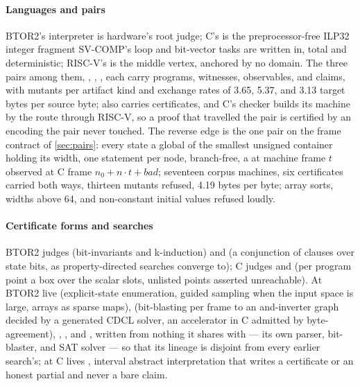 \paragraph{Languages and pairs}
BTOR2's interpreter is hardware's root judge; C's is the
preprocessor-free ILP32 integer fragment SV-COMP's loop and
bit-vector tasks are written in, total and deterministic; RISC-V's is
the middle vertex, anchored by no domain. The three pairs among
them, , , , each
carry programs, witnesses, observables, and claims, with mutants per
artifact kind and exchange rates of 3.65, 5.37, and 3.13 target bytes
per source byte;  also carries certificates, and
C's  checker builds its machine by the route through
RISC-V,
so a proof that travelled the pair is certified by an encoding the
pair never touched. The
reverse edge  is the one pair on the frame contract of
\cref{sec:pairs}: every state a global of the smallest unsigned
container holding its width, one statement per node, 
branch-free, a  at machine frame $t$ observed at C frame
$n_0 + n \cdot t + \textit{bad}$; seventeen corpus machines, six
certificates carried both ways, thirteen mutants refused, 4.19 bytes
per byte; array sorts, widths above 64, and non-constant initial
values refused loudly.

\paragraph{Certificate forms and searches}
BTOR2 judges  (bit-invariants and k-induction) and
 (a conjunction of clauses over state bits, as
property-directed searches converge to); C judges 
and  (per program point a box over the scalar slots,
unlisted points asserted unreachable). At BTOR2 live
 (explicit-state enumeration, guided sampling when
the input space is large, arrays as sparse maps), 
(bit-blasting per frame to an and-inverter graph decided by a
generated CDCL solver, an accelerator in C admitted by
byte-agreement), , ,
and  \citep{een2011pdr}, written from nothing it
shares with  --- its own parser, bit-blaster, and SAT
solver --- so that its lineage is disjoint from every earlier
search's; at C lives , interval abstract interpretation
that writes a  certificate or an honest partial and
never a bare claim.

